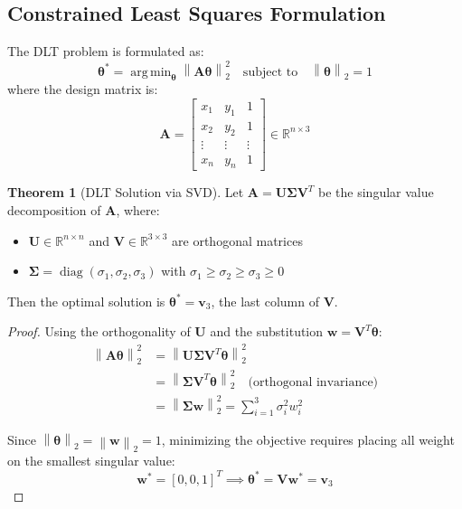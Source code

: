 \documentclass[12pt]{article}
\DeclareMathOperator{\argmin}{arg\,min}
\DeclareMathOperator{\diag}{diag}
\renewcommand{\vec}[1]{\mathbf{#1}}
\newcommand{\norm}[1]{\left\lVert #1 \right\rVert}
\newcommand{\R}{\mathbb{R}}
\theoremstyle{definition}
\newtheorem{theorem}{Theorem}[section]
\begin{document}
\subsection{Constrained Least Squares Formulation}

The DLT problem is formulated as:
\begin{equation}
    \vec{\theta}^* = \argmin_{\vec{\theta}} \norm{\vec{A}\vec{\theta}}_2^2 \quad \text{subject to} \quad \norm{\vec{\theta}}_2 = 1
\end{equation}
where the design matrix is:
\begin{equation}
    \vec{A} = \begin{bmatrix}
        x_1    & y_1    & 1      \\
        x_2    & y_2    & 1      \\
        \vdots & \vdots & \vdots \\
        x_n    & y_n    & 1
    \end{bmatrix} \in \R^{n \times 3}
\end{equation}

\begin{theorem}[DLT Solution via SVD] \label{thm:dlt}
    Let $\vec{A} = \vec{U}\vec{\Sigma}\vec{V}^T$ be the singular value decomposition of $\vec{A}$, where:
    \begin{itemize}
        \item $\vec{U} \in \R^{n \times n}$ and $\vec{V} \in \R^{3 \times 3}$ are orthogonal matrices
        \item $\vec{\Sigma} = \diag(\sigma_1, \sigma_2, \sigma_3)$ with $\sigma_1 \geq \sigma_2 \geq \sigma_3 \geq 0$
    \end{itemize}
    Then the optimal solution is $\vec{\theta}^* = \vec{v}_3$, the last column of $\vec{V}$.
\end{theorem}

\begin{proof}
    Using the orthogonality of $\vec{U}$ and the substitution $\vec{w} = \vec{V}^T\vec{\theta}$:
    \begin{align}
        \norm{\vec{A}\vec{\theta}}_2^2 & = \norm{\vec{U}\vec{\Sigma}\vec{V}^T\vec{\theta}}_2^2                               \\
                                       & = \norm{\vec{\Sigma}\vec{V}^T\vec{\theta}}_2^2 \quad \text{(orthogonal invariance)} \\
                                       & = \norm{\vec{\Sigma}\vec{w}}_2^2 = \sum_{i=1}^3 \sigma_i^2 w_i^2
    \end{align}

    Since $\norm{\vec{\theta}}_2 = \norm{\vec{w}}_2 = 1$, minimizing the objective requires placing all weight on the smallest singular value:
    \begin{equation}
        \vec{w}^* = [0, 0, 1]^T \implies \vec{\theta}^* = \vec{V}\vec{w}^* = \vec{v}_3
    \end{equation}
\end{proof}
\end{document}
